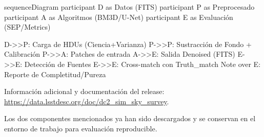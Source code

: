 \begin{mermaid}[width=0.9\linewidth, caption={Secuencia de procesamiento desde datos crudos hasta métricas}, pos=t]
sequenceDiagram
    participant D as Datos (FITS)
    participant P as Preprocesado
    participant A as Algoritmos (BM3D/U-Net)
    participant E as Evaluaci\'on (SEP/Metrics)

    D->>P: Carga de HDUs (Ciencia+Varianza)
    P->>P: Sustracci\'on de Fondo + Calibraci\'on
    P->>A: Patches de entrada
    A->>E: Salida Denoised (FITS)
    E->>E: Detecci\'on de Fuentes
    E->>E: Cross-match con Truth_match
    Note over E: Reporte de Completitud/Pureza
\end{mermaid}

\bigskip

Informaci\'on adicional y documentaci\'on del release: \url{https://data.lsstdesc.org/doc/dc2_sim_sky_survey}.

\bigskip

Los dos componentes mencionados ya han sido descargados y se conservan en el entorno de trabajo para evaluaci\'on reproducible.
